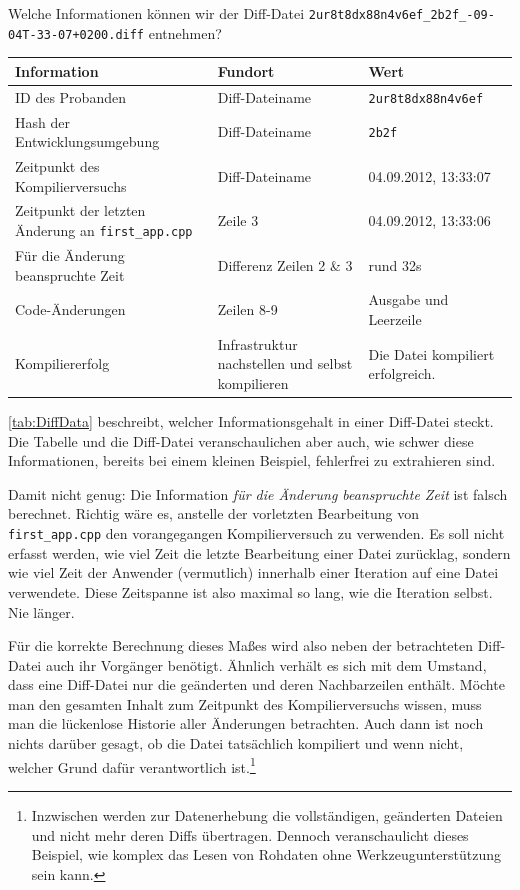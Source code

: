 Welche Informationen können wir der Diff-Datei \texttt{2ur8t8dx88n4v6ef\_2b2f\_-09-04T-33-07+0200.diff} entnehmen?
  
\begin{center}
  \begin{tabularx}{\linewidth}{X X X}
  \textbf{Information} & \textbf{Fundort} & \textbf{Wert} \\
  \midrule
  ID des Probanden & Diff-Dateiname & \texttt{2ur8t8dx88n4v6ef} \\
  Hash der Entwicklungsumgebung & Diff-Dateiname & \texttt{2b2f} \\
  Zeitpunkt des Kompilierversuchs & Diff-Dateiname & 04.09.2012, 13:33:07 \\
  Zeitpunkt der letzten Änderung an \texttt{first\_app.cpp} & Zeile 3 & 04.09.2012, 13:33:06 \\
  Für die Änderung beanspruchte Zeit & Differenz Zeilen 2 \& 3 & rund 32s \\
  Code-Änderungen & Zeilen 8-9 & Ausgabe und Leerzeile \\
  Kompiliererfolg & Infrastruktur nachstellen und selbst kompilieren & Die Datei kompiliert erfolgreich. \\
  \end{tabularx}
  \label{tab:DiffData}
\end{center}
  
\autoref{tab:DiffData} beschreibt, welcher Informationsgehalt in einer Diff-Datei steckt. Die Tabelle und die Diff-Datei veranschaulichen aber auch, wie schwer diese Informationen, bereits bei einem kleinen Beispiel, fehlerfrei zu extrahieren sind.
  
Damit nicht genug: Die Information \textit{für die Änderung beanspruchte Zeit} ist falsch berechnet. Richtig wäre es, anstelle der vorletzten Bearbeitung von \texttt{first\_app.cpp} den vorangegangen Kompilierversuch zu verwenden. Es soll  nicht erfasst werden, wie viel Zeit die letzte Bearbeitung einer Datei zurücklag, sondern wie viel Zeit der Anwender (vermutlich) innerhalb einer Iteration auf eine Datei verwendete. Diese Zeitspanne ist also maximal so lang, wie die Iteration selbst. Nie länger.
  
Für die korrekte Berechnung dieses Maßes wird also neben der betrachteten Diff-Datei auch ihr Vorgänger benötigt. Ähnlich verhält es sich mit dem Umstand, dass eine Diff-Datei nur die geänderten und deren Nachbarzeilen enthält. Möchte man den gesamten Inhalt zum Zeitpunkt des Kompilierversuchs wissen, muss man die lückenlose Historie aller Änderungen betrachten. Auch dann ist noch nichts darüber gesagt, ob die Datei tatsächlich kompiliert und wenn nicht, welcher Grund dafür verantwortlich ist.\footnote{Inzwischen werden zur Datenerhebung die vollständigen, geänderten Dateien und nicht mehr deren Diffs übertragen. Dennoch veranschaulicht dieses Beispiel, wie komplex das Lesen von Rohdaten ohne Werkzeugunterstützung sein kann.}

